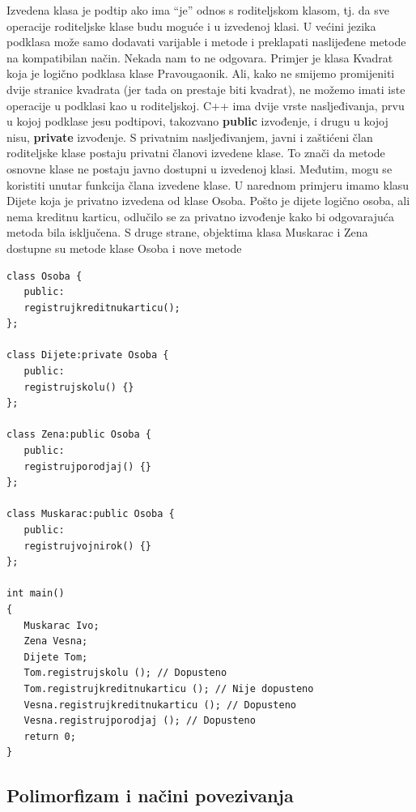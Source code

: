 \documentclass[11pt]{book}
\begin{document}
Izvedena klasa je podtip ako ima “je” odnos s roditeljskom klasom, tj. da sve operacije roditeljske klase budu moguće i u izvedenoj klasi. U većini jezika podklasa može samo  dodavati varijable i metode i preklapati naslijeđene metode na kompatibilan način. Nekada nam to ne odgovara. Primjer je klasa Kvadrat koja je logično podklasa klase Pravougaonik. Ali, kako ne smijemo promijeniti dvije stranice kvadrata (jer tada on prestaje biti kvadrat), ne možemo imati iste operacije u podklasi kao u roditeljskoj. C++ ima dvije vrste nasljeđivanja, prvu u kojoj podklase jesu podtipovi, takozvano \textbf{public} izvođenje, i drugu u kojoj nisu, \textbf{private} izvođenje. S privatnim nasljeđivanjem, javni i zaštićeni član roditeljske klase postaju privatni članovi izvedene klase. To znači da metode osnovne klase ne postaju javno dostupni u izvedenoj klasi. Međutim, mogu se koristiti unutar funkcija člana izvedene klase. U narednom primjeru imamo klasu Dijete koja je privatno izvedena od klase Osoba. Pošto je dijete logično osoba, ali nema kreditnu karticu, odlučilo se za privatno izvođenje kako bi odgovarajuća metoda bila isključena. S druge strane, objektima klasa Muskarac i Zena dostupne su metode klase Osoba i nove metode

\begin{lstlisting}
class Osoba {
   public:
   registrujkreditnukarticu();
};

class Dijete:private Osoba {
   public: 
   registrujskolu() {}
};	

class Zena:public Osoba {
   public: 
   registrujporodjaj() {}
};

class Muskarac:public Osoba {
   public: 
   registrujvojnirok() {}
};

int main() 
{
   Muskarac Ivo;
   Zena Vesna;
   Dijete Tom;
   Tom.registrujskolu (); // Dopusteno 
   Tom.registrujkreditnukarticu (); // Nije dopusteno 
   Vesna.registrujkreditnukarticu (); // Dopusteno 
   Vesna.registrujporodjaj (); // Dopusteno 
   return 0;
}
\end{lstlisting}

\subsection{Polimorfizam i načini povezivanja}
\end{document}
